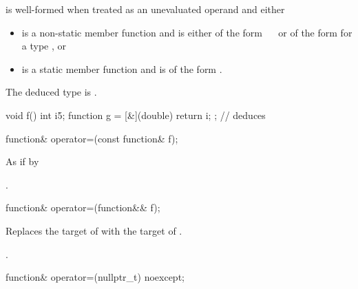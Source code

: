 \begin{itemdescr}
\pnum
\constraints
{} is well-formed when treated as an unevaluated operand and either
\begin{itemize}
\item
{} is a non-static member function and
 is either of the form
~\cv{}~
or of the form
for a type , or
\item
{} is a static member function and
 is of the form
.
\end{itemize}

\pnum
\remarks
The deduced type is .

\pnum
\begin{example}
\begin{codeblock}
void f() {
  int i{5};
  function g = [&](double) { return i; };       // deduces 
}
\end{codeblock}
\end{example}
\end{itemdescr}

%
\begin{itemdecl}
function& operator=(const function& f);
\end{itemdecl}

\begin{itemdescr}
\pnum
\effects
As if by 

\pnum
\returns
{}.
\end{itemdescr}

%
\begin{itemdecl}
function& operator=(function&& f);
\end{itemdecl}

\begin{itemdescr}
\pnum
\effects
Replaces the target of 
with the target of .

\pnum
\returns
{}.
\end{itemdescr}

%
\begin{itemdecl}
function& operator=(nullptr_t) noexcept;
\end{itemdecl}

